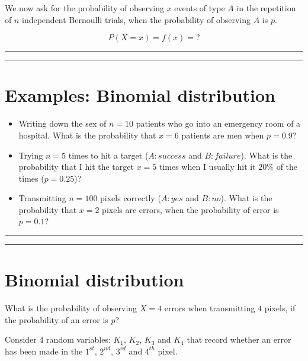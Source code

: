 \documentclass[
]{book}
\begin{document}
We now ask for the probability of observing \(x\) events of type \(A\) in the repetition of \(n\) independent Bernoulli trials, when the probability of observing \(A\) is \(p\).

\[P(X=x)=f(x)=?\]

\begin{center}\rule{0.5\linewidth}{0.5pt}\end{center}

\begin{center}\rule{0.5\linewidth}{0.5pt}\end{center}

\hypertarget{examples-binomial-distribution}{%
\section{Examples: Binomial distribution}\label{examples-binomial-distribution}}

\begin{itemize}
\item
  Writing down the sex of \(n=10\) patients who go into an emergency room of a hospital. What is the probability that \(x=6\) patients are men when \(p=0.9\)?
\item
  Trying \(n=5\) times to hit a target (\(A:success\) and \(B:failure\)). What is the probability that I hit the target \(x=5\) times when I usually hit it \(20\%\) of the times (\(p=0.25\))?
\item
  Transmitting \(n=100\) pixels correctly (\(A:yes\) and \(B:no\)). What is the probability that \(x=2\) pixels are errors, when the probability of error is \(p=0.1\)?
\end{itemize}

\begin{center}\rule{0.5\linewidth}{0.5pt}\end{center}

\begin{center}\rule{0.5\linewidth}{0.5pt}\end{center}

\hypertarget{binomial-distribution-1}{%
\section{Binomial distribution}\label{binomial-distribution-1}}

What is the probability of observing \(X=4\) errors when transmitting \(4\) pixels, if the probability of an error is \(p\)?

Consider \(4\) random variables: \(K_1\), \(K_2\), \(K_3\) and \(K_4\) that record whether an error has been made in the \(1^{st}\), \(2^{nd}\), \(3^{rd}\) and \(4^{th}\) pixel.
\end{document}
